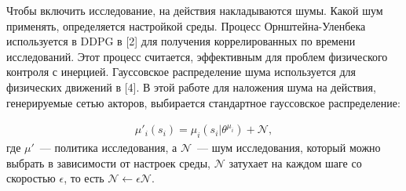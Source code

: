 Чтобы включить исследование, на действия накладываются шумы. Какой шум применять, определяется настройкой среды. Процесс Орнштейна-Уленбека используется в DDPG в [2] для получения коррелированных по времени исследований. Этот процесс считается, эффективным для проблем физического контроля с инерцией. Гауссовское распределение шума используется для физических движений в [4]. В этой работе для наложения шума на действия, генерируемые сетью акторов, выбирается стандартное гауссовское распределение:

\begin{equation}
    \begin{multlined}
        \mu'_i(s_i) = \mu_i(s_i|\theta^{\mu_i}) + \mathcal{N},
    \end{multlined}
\end{equation}
где $\mu'$~--- политика исследования, а $\mathcal{N}$~--- шум исследования, который можно выбрать в зависимости от настроек среды, $\mathcal{N}$ затухает на каждом шаге со скоростью $\epsilon$, то есть $\mathcal{N} \leftarrow \epsilon \mathcal{N}$.
